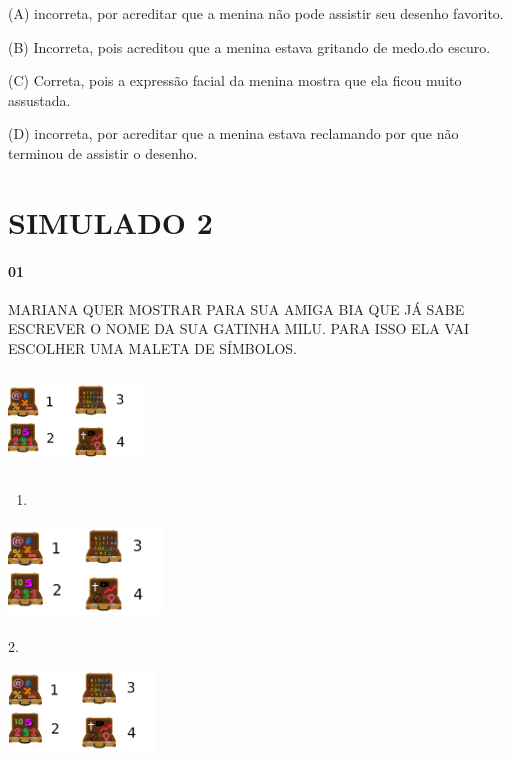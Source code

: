\begin{escola}
(A) incorreta, por acreditar que a menina não pode assistir seu desenho
favorito.

(B) Incorreta, pois acreditou que a menina estava gritando de medo.do
escuro.

(C) Correta, pois a expressão facial da menina mostra que ela ficou
muito assustada.

(D) incorreta, por acreditar que a menina estava reclamando por que não
terminou de assistir o desenho.

\chapter{SIMULADO 2}

\subsubsection{01}\label{section-41}

MARIANA QUER MOSTRAR PARA SUA AMIGA BIA QUE JÁ SABE ESCREVER O NOME DA
SUA GATINHA MILU. PARA ISSO ELA VAI ESCOLHER UMA MALETA DE SÍMBOLOS.

\includegraphics[width=1.40208in,height=1.03194in]{media/image209.png}

\begin{enumerate}
\def\labelenumi{\arabic{enumi}.}
\item
\end{enumerate}

\includegraphics[width=1.62986in,height=0.98819in]{media/image209.png}

2.

\includegraphics[width=1.55139in,height=0.85000in]{media/image209.png}


\end{escola}
